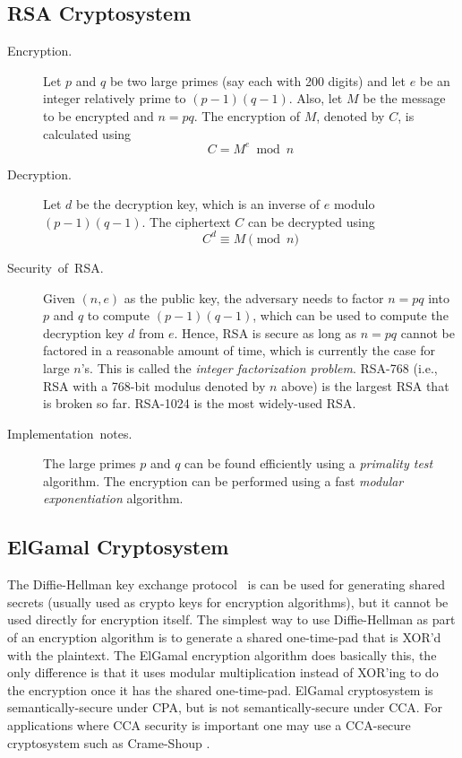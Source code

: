 \documentclass[10pt]{article}
\theoremstyle{plain}
\begin{document}
\subsection{RSA Cryptosystem}
\begin{description}
	\item [{Encryption.}] Let $p$ and $q$ be two large primes (say each with
	200 digits) and let $e$ be an integer relatively prime to $(p-1)(q-1)$.
	Also, let $M$ be the message to be encrypted and $n=pq$. The encryption
	of $M$, denoted by $C$, is calculated using 
	\[
	C=M^{e}\bmod n
	\]
	\item [{Decryption.}] Let $d$ be the decryption key, which is an inverse
	of $e$ modulo $(p-1)(q-1)$. The ciphertext $C$ can be decrypted
	using 
	\[
	C^{d}\equiv M\pmod{n}
	\]
	\item [{Security~of~RSA.}] Given $(n,e)$ as the public key, the adversary
	needs to factor $n=pq$ into $p$ and $q$ to compute $(p-1)(q-1)$,
	which can be used to compute the decryption key $d$ from $e$. Hence,
	RSA is secure as long as $n=pq$ cannot be factored in a reasonable
	amount of time, which is currently the case for large $n$'s. This
	is called the \emph{integer factorization problem}. RSA-768 (i.e.,
	RSA with a 768-bit modulus denoted by $n$ above) is the largest RSA
	that is broken so far. RSA-1024 is the most widely-used RSA.
	\item [{Implementation~notes.}] The large primes $p$ and $q$ can be
	found efficiently using a \emph{primality test} algorithm. The encryption
	can be performed using a fast \emph{modular exponentiation} algorithm.
\end{description}

\subsection{ElGamal Cryptosystem}

The Diffie-Hellman key exchange protocol~\cite{Diffie:2006:NDC:2263321.2269104}
is can be used for generating shared secrets (usually used as crypto
keys for encryption algorithms), but it cannot be used directly for
encryption itself. The simplest way to use Diffie-Hellman as part
of an encryption algorithm is to generate a shared one-time-pad that
is XOR'd with the plaintext. The ElGamal encryption algorithm does
basically this, the only difference is that it uses modular multiplication
instead of XOR'ing to do the encryption once it has the shared one-time-pad.
ElGamal cryptosystem is semantically-secure under CPA, but is not
semantically-secure under CCA. For applications where CCA security
is important one may use a CCA-secure cryptosystem such as Crame-Shoup
\cite{Cramer:1998:PPK:646763.706340}. 
\end{document}

